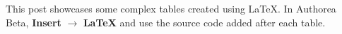 This post showcases some complex tables created using LaTeX. In Authorea Beta, \textbf{Insert} $\rightarrow$ \textbf{LaTeX} and use the source code added after each table.

\newline